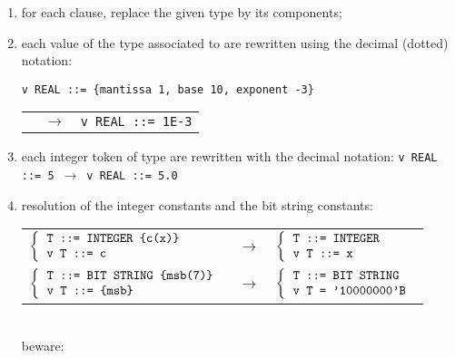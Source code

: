 \begin{enumerate}
  \item for each \kwdCOMPONENTSOF clause, replace the given type by
        its components;

  \item each value of the type associated to \kwdREAL are rewritten
        using the decimal (dotted) notation:
 
        \verb+v REAL ::= {mantissa 1, base 10, exponent -3}+\\
        \begin{tabular}{rcl}
           & $\longrightarrow$
           & \verb+v REAL ::= 1E-3+
        \end{tabular}

  \item each integer token of type \kwdREAL are rewritten with the
        decimal notation: \verb+v REAL ::= 5+ $\, \longrightarrow \,$
        \verb+v REAL ::= 5.0+

  \item resolution of the integer constants and the bit string
        constants:

        \begin{tabular}{lcl}
           $\left\{
              \begin{tabular}{l}
                 \verb+T ::= INTEGER {c(x)}+\\
                 \verb+v T ::= c+
              \end{tabular}
            \right.$
         & $\longrightarrow$
         & $\left\{
              \begin{tabular}{l}
                \verb+T ::= INTEGER+\\
                \verb+v T ::= x+
              \end{tabular}
            \right.$ \\
           $\left\{
              \begin{tabular}{l}
                 \verb+T ::= BIT STRING {msb(7)}+\\
                 \verb+v T ::= {msb}+
              \end{tabular}
            \right.$
         & $\longrightarrow$
         & $\left\{
              \begin{tabular}{l}
                 \verb+T ::= BIT STRING+\\
                 \verb+v T = '10000000'B+
              \end{tabular} 
            \right.$
        \end{tabular} \\
        beware:


\end{enumerate}
